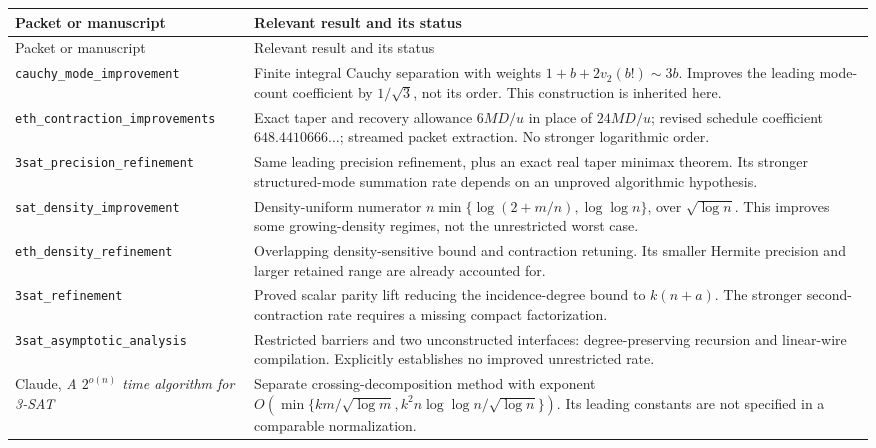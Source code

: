\documentclass[11pt]{article}
\theoremstyle{remark}\newtheorem{remark}[theorem]{Remark}
\newcommand{\vTwo}{v_2}
\begin{document}
\begin{longtable}{@{}p{}p{}@{}}
\toprule
Packet or manuscript & Relevant result and its status \\
\midrule\endfirsthead
\toprule Packet or manuscript & Relevant result and its status \\
\midrule\endhead
\texttt{cauchy\_mode\_}\newline\texttt{improvement}
& Finite integral Cauchy separation with weights \(1+b+2\vTwo(b!)\sim3b\). Improves the leading mode-count coefficient by \(1/\sqrt3\), not its order. This construction is inherited here. \\
\addlinespace
\texttt{eth\_contraction\_}\newline\texttt{improvements}
& Exact taper and recovery allowance \(6MD/u\) in place of \(24MD/u\); revised schedule coefficient \(648.4410666\ldots\); streamed packet extraction. No stronger logarithmic order. \\
\addlinespace
\texttt{3sat\_precision\_}\newline\texttt{refinement}
& Same leading precision refinement, plus an exact real taper minimax theorem. Its stronger structured-mode summation rate depends on an unproved algorithmic hypothesis. \\
\addlinespace
\texttt{sat\_density\_}\newline\texttt{improvement}
& Density-uniform numerator \(n\min\{\log(2+m/n),\log\log n\}\), over \(\sqrt{\log n}\). This improves some growing-density regimes, not the unrestricted worst case. \\
\addlinespace
\texttt{eth\_density\_}\newline\texttt{refinement}
& Overlapping density-sensitive bound and contraction retuning. Its smaller Hermite precision and larger retained range are already accounted for. \\
\addlinespace
\texttt{3sat\_refinement}
& Proved scalar parity lift reducing the incidence-degree bound to \(k(n+a)\). The stronger second-contraction rate requires a missing compact factorization. \\
\addlinespace
\texttt{3sat\_asymptotic\_}\newline\texttt{analysis}
& Restricted barriers and two unconstructed interfaces: degree-preserving recursion and linear-wire compilation. Explicitly establishes no improved unrestricted rate. \\
\addlinespace
Claude, \emph{A \(2^{o(n)}\) time algorithm for 3-SAT}
& Separate crossing-decomposition method with exponent \(O(\min\{km/\sqrt{\log m},k^2n\log\log n/\sqrt{\log n}\})\). Its leading constants are not specified in a comparable normalization. \\
\bottomrule
\end{longtable}
\normalsize
\end{document}
